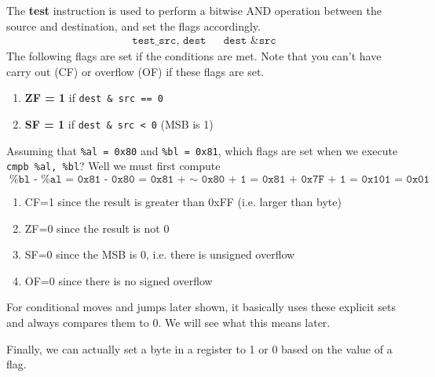 \documentclass{article}
\begin{document}
      \begin{definition}[Test]
        The \textbf{test} instruction is used to perform a bitwise AND operation between the source and destination, and set the flags accordingly. 
        \begin{align*}
          \texttt{test\_ src, dest} && \texttt{dest \& src} 
        \end{align*}
        The following flags are set if the conditions are met. Note that you can't have carry out (CF) or overflow (OF) if these flags are set. 
        \begin{enumerate}
          \item \textbf{ZF = 1} if \texttt{dest \& src == 0} 
          \item \textbf{SF = 1} if \texttt{dest \& src < 0} (MSB is 1) 
        \end{enumerate}
      \end{definition}

      \begin{example}[Compare] 
        Assuming that \texttt{\%al = 0x80} and \texttt{\%bl = 0x81}, which flags are set when we execute \texttt{cmpb \%al, \%bl}? Well we must first compute 
        \begin{equation}
          \texttt{\%bl - \%al = 0x81 - 0x80 = 0x81 + $\sim$ 0x80 + 1 = 0x81 + 0x7F + 1 = 0x101 = 0x01}
        \end{equation}
        \begin{enumerate}
          \item CF=1 since the result is greater than 0xFF (i.e. larger than byte) 
          \item ZF=0 since the result is not 0 
          \item SF=0 since the MSB is 0, i.e. there is unsigned overflow
          \item OF=0 since there is no signed overflow
        \end{enumerate}
      \end{example}

      For conditional moves and jumps later shown, it basically uses these explicit sets and always compares them to $0$. We will see what this means later. 

      Finally, we can actually set a byte in a register to 1 or 0 based on the value of a flag. 

      \begin{definition}[Set]
        
      \end{definition}
\end{document}
